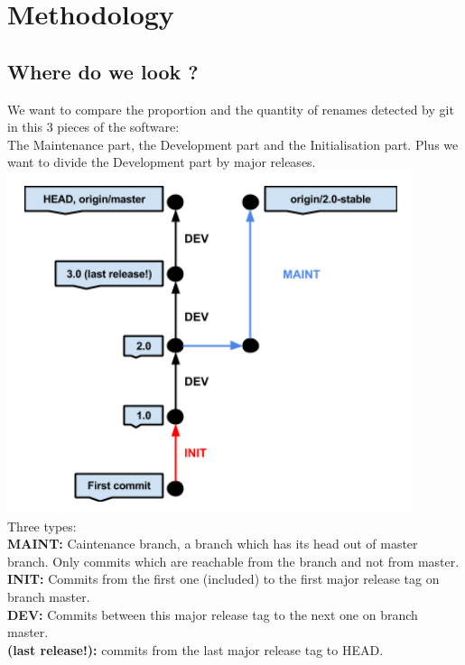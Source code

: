 \section{Methodology}
\label{sec:methodology}
\subsection{Where do we look ?}
We want to compare the proportion and the quantity of renames detected by git in this 3 pieces of the software:\\
The Maintenance part, the Development part and the Initialisation part. Plus we want to divide the Development part by major releases.\\
\includegraphics[scale=0.5]{illustrations/draw1}\\
Three types:\\
\textbf{MAINT:} Caintenance branch, a branch which has its head out of master branch. Only commits which are reachable from the branch and not from master.\\
\textbf{INIT:} Commits from the first one (included) to the first major release tag on branch master.\\
\textbf{DEV:} Commits between this major release tag to the next one on branch master.\\
\textbf{(last release!):} commits from the last major release tag to HEAD.\\
\label{subsec:Where do we look ?}
